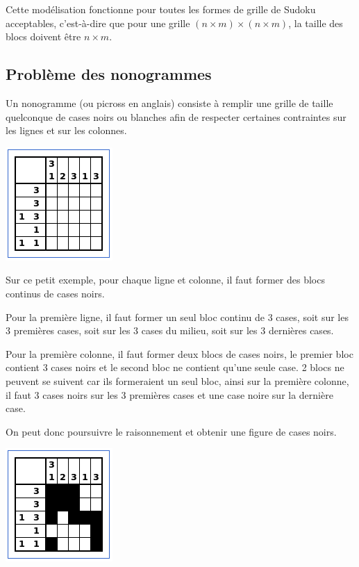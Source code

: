 \documentclass[12pt]{extarticle}
\begin{document}
Cette modélisation fonctionne pour toutes les formes de grille de Sudoku acceptables, c'est-à-dire que pour une grille $(n \times m) \times (n \times m)$, la taille des blocs doivent être $n \times m$.

\subsection{Problème des nonogrammes}

Un nonogramme (ou picross en anglais) consiste à remplir une grille de taille quelconque de cases noirs ou blanches afin de respecter certaines contraintes sur les lignes et sur les colonnes.

\vspace{2em}

\begin{center}
\includegraphics[]{nonogram1.png}
\end{center}

\vspace{2em}

Sur ce petit exemple, pour chaque ligne et colonne, il faut former des blocs continus de cases noirs.

Pour la première ligne, il faut former un seul bloc continu de 3 cases, soit sur les 3 premières cases, soit sur les 3 cases du milieu, soit sur les 3 dernières cases.

Pour la première colonne, il faut former deux blocs de cases noirs, le premier bloc contient 3 cases noirs et le second bloc ne contient qu'une seule case. 2 blocs ne peuvent se suivent car ils formeraient un seul bloc, ainsi sur la première colonne, il faut 3 cases noirs sur les 3 premières cases et une case noire sur la dernière case.

On peut donc poursuivre le raisonnement et obtenir une figure de cases noirs.

\vspace{2em}

\begin{center}
\includegraphics[]{nonogram1-solution.png}
\end{center}
\end{document}
